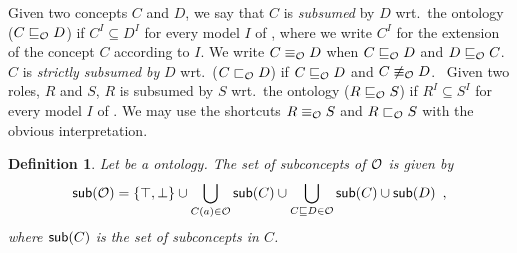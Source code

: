 \documentclass[
]{ceurart}
\newtheorem{definition}{Definition}
\begin{document}
Given two concepts $C$ and $D$, we say that $C$ is \emph{subsumed} by $D$ wrt.\ the ontology \Ontology ($C \sqsubseteq_{\mathcal{O}} D$) if $C^I \subseteq D^I$ for every model 
$I$ of \Ontology, where we write $C^I$ for the extension of the concept $C$ according to $I$. We write $C \equiv_{\mathcal{O}} D$ when $C \sqsubseteq_{\mathcal{O}} D$ and 
$D \sqsubseteq_{\mathcal{O}} C$. 
%
$C$ is \emph{strictly subsumed by} $D$ wrt.\ \Ontology ($C \sqsubset_{\mathcal{O}} D$) if 
$C \sqsubseteq_{\mathcal{O}} D$ and $C \not\equiv_{\mathcal{O}} D$.\
%
%
Given two roles, $R$ and $S$, $R$ is subsumed by $S$ wrt.\ the ontology \Ontology ($R \sqsubseteq_{\mathcal{O}} S$) if $R^I \subseteq S^I$ for every model $I$ of \Ontology. We may use the shortcuts $R \equiv_{\mathcal{O}} S$ and $R \sqsubset_{\mathcal{O}} S$ with the obvious interpretation.


%
\begin{definition}\label{def:sub}
Let \Ontology be a \SROIQ ontology. %
The set of \emph{subconcepts} of $\mathcal{O}$ is given by 
\begin{equation*}
\mathop{\mathsf{sub}}(\mathcal{\mathcal{O}}) = \{\top,\bot\} \cup \bigcup_{C(a) \in \mathcal{O}} \mathop{\mathsf{sub}}(C) \cup \bigcup_{C \sqsubseteq D \in \mathcal{O}} \mathop{\mathsf{sub}}(C) \cup \mathop{\mathsf{sub}}(D) \enspace ,
\end{equation*}
% 
where %
$\mathop{\mathsf{sub}}(C)$ is the set of subconcepts in $C$.

\end{definition}

\end{document}
